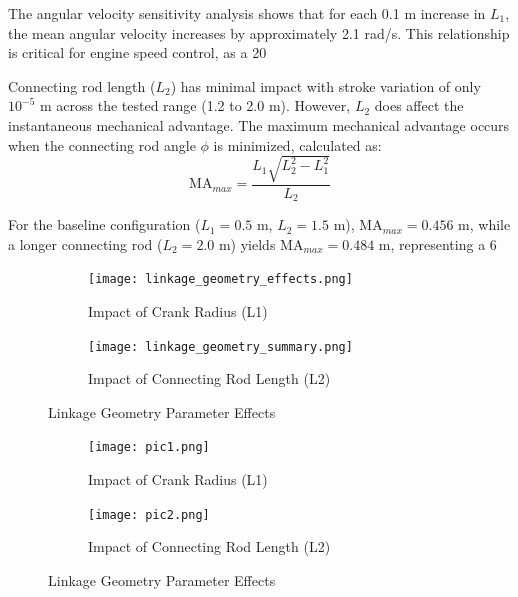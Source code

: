 \documentclass[10pt]{article}
\begin{document}
The angular velocity sensitivity analysis shows that for each 0.1 m increase in $L_1$, the mean angular velocity increases by approximately 2.1 rad/s. This relationship is critical for engine speed control, as a 20%

Connecting rod length ($L_2$) has minimal impact with stroke variation of only $10^{-5}$ m across the tested range (1.2 to 2.0 m). However, $L_2$ does affect the instantaneous mechanical advantage. The maximum mechanical advantage occurs when the connecting rod angle \(\phi\) is minimized, calculated as:
\begin{equation}
    \text{MA}_{max} = \frac{L_1 \sqrt{L_2^2 - L_1^2}}{L_2}
\end{equation}

For the baseline configuration ($L_1 = 0.5$ m, $L_2 = 1.5$ m), \(\text{MA}_{max} = 0.456\) m, while a longer connecting rod ($L_2 = 2.0$ m) yields \(\text{MA}_{max} = 0.484\) m, representing a 6%

\begin{figure}[H]
    \centering
    \begin{subfigure}[b]{0.48\textwidth}
        \centering
        \texttt{[image: linkage\_geometry\_effects.png]}
        \caption{Impact of Crank Radius (L1)}
    \end{subfigure}
    \hfill
    \begin{subfigure}[b]{0.48\textwidth}
        \centering
        \texttt{[image: linkage\_geometry\_summary.png]}
        \caption{Impact of Connecting Rod Length (L2)}
    \end{subfigure}
    \caption{Linkage Geometry Parameter Effects}
\end{figure}

\begin{figure}[H]
    \centering
    \begin{subfigure}[b]{0.48\textwidth}
        \centering
        \texttt{[image: pic1.png]}
        \caption{Impact of Crank Radius (L1)}
    \end{subfigure}
    \hfill
    \begin{subfigure}[b]{0.48\textwidth}
        \centering
        \texttt{[image: pic2.png]}
        \caption{Impact of Connecting Rod Length (L2)}
    \end{subfigure}
    \caption{Linkage Geometry Parameter Effects}
\end{figure}
\end{document}
